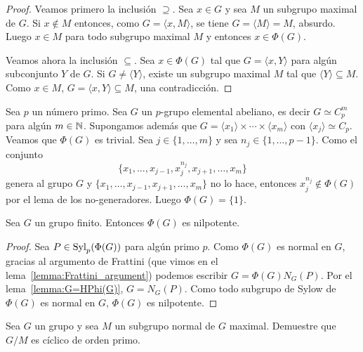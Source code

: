 \begin{proof}
	Veamos primero la inclusión $\supseteq$.  Sea $x\in G$ y sea $M$ un
	subgrupo maximal de $G$.  Si $x\not\in M$ entonces, como $G=\langle
	x,M\rangle$, se tiene $G=\langle M\rangle=M$, absurdo. Luego $x\in M$ para
	todo subgrupo maximal $M$ y entonces $x\in \Phi(G)$. 

	Veamos ahora la inclusión $\subseteq$. Sea $x\in\Phi(G)$ tal que $G=\langle
	x,Y\rangle$ para algún subconjunto $Y$ de $G$. Si $G\ne \langle Y\rangle$,
	existe un subgrupo maximal $M$ tal que $\langle Y\rangle\subseteq M$. Como
	$x\in M$, $G=\langle x,Y\rangle\subseteq M$, una contradicción.
\end{proof}

\begin{example}
	Sea $p$ un número primo. Sea $G$ un $p$-grupo elemental abeliano, es decir
	$G\simeq C_p^m$ para algún $m\in\mathbb{N}$.  Supongamos además que
	$G=\langle x_1\rangle\times\cdots\times\langle x_m\rangle$ con $\langle x_j\rangle\simeq C_p$.  
	Veamos que $\Phi(G)$ es trivial. 
	Sea $j\in\{1,\dots,m\}$ y sea $n_j\in\{1,\dots,p-1\}$. Como el conjunto
	\[
	\{x_1,\dots,x_{j-1},x_j^{n_j},x_{j+1},\dots,x_m\}
	\]
	genera al grupo $G$ y $\{x_1,\dots,x_{j-1},x_{j+1},\dots,x_m\}$ no lo hace,
	entonces $x_j^{n_j}\not\in\Phi(G)$ por el lema de los no-generadores. 
	Luego $\Phi(G)=\{1\}$.
\end{example}

\begin{theorem}[Frattini]
	\label{theorem:Frattini}
	Sea $G$ un grupo finito. Entonces $\Phi(G)$ es nilpotente.
\end{theorem}

\begin{proof}
	Sea $P\in\mathrm{Syl}_p(\Phi(G))$ para algún primo $p$. Como $\Phi(G)$ es normal en
	$G$, gracias al argumento de Frattini (que vimos en el lema~\ref{lemma:Frattini_argument}) 
	podemos escribir $G=\Phi(G)N_G(P)$. Por el lema~\ref{lemma:G=HPhi(G)},
	$G=N_G(P)$. Como todo subgrupo de Sylow de $\Phi(G)$ es normal en $G$,
	$\Phi(G)$ es nilpotente.
\end{proof}

\begin{exercise}
	\label{exercise:G/M}
	Sea $G$ un grupo y sea $M$ un subgrupo normal de $G$ maximal. Demuestre que
	$G/M$ es cíclico de orden primo. 
\end{exercise}


